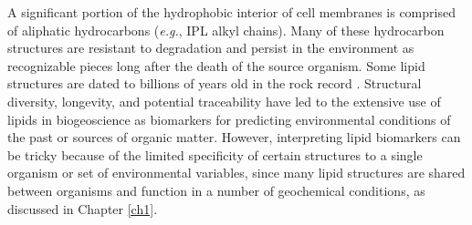 
A significant portion of the hydrophobic interior of cell membranes is comprised of aliphatic hydrocarbons (\textit{e.g.}, IPL alkyl chains). Many of these hydrocarbon structures are resistant to degradation and persist in the environment as recognizable pieces long after the death of the source organism. Some lipid structures are dated to billions of years old in the rock record \citep{brocks2003composition, brocks2003reconstruction}. Structural diversity, longevity, and potential traceability have led to the extensive use of lipids in biogeoscience as biomarkers for predicting environmental conditions of the past or sources of organic matter. However, interpreting lipid biomarkers can be tricky because of the limited specificity of certain structures to a single organism or set of environmental variables, since many lipid structures are shared between organisms and function in a number of geochemical conditions, as discussed in Chapter \ref{ch1}.

